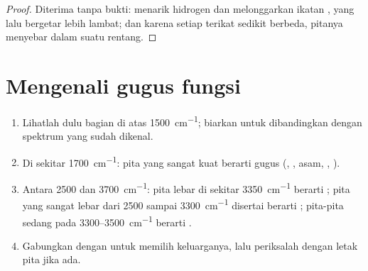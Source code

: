 \begin{proof}
Diterima tanpa bukti:  menarik  hidrogen dan
melonggarkan ikatan , yang lalu bergetar lebih lambat; dan karena
setiap  terikat sedikit berbeda, pitanya menyebar dalam suatu
rentang.
\end{proof}

\section{Mengenali gugus fungsi}


\begin{method}\label{met:g11:infrared:reading}
\begin{enumerate}
  \item Lihatlah dulu bagian di atas \qty{1500}{cm^{-1}}; biarkan  untuk dibandingkan dengan spektrum yang sudah dikenal.
  \item Di sekitar \qty{1700}{cm^{-1}}: pita yang sangat kuat berarti
        gugus  (, , asam, , ).
  \item Antara 2500 dan \qty{3700}{cm^{-1}}: pita lebar di sekitar
        \qty{3350}{cm^{-1}} berarti  ; pita yang sangat
        lebar dari 2500 sampai \qty{3300}{cm^{-1}} disertai 
        berarti ; pita-pita sedang pada
        3300--\qty{3500}{cm^{-1}} berarti .
  \item Gabungkan dengan  untuk memilih keluarganya, lalu
        periksalah dengan letak pita  jika ada.
\end{enumerate}
\end{method}

